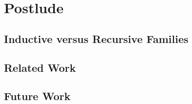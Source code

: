 \documentclass[12pt]{report}
\theoremstyle{definition}
\theoremstyle{remark}
\numberwithin{definition}{section}
\numberwithin{equation}{section}
\numberwithin{proposition}{section}
\numberwithin{conjecture}{section}
\numberwithin{theorem}{section}
\numberwithin{lemma}{section}
\numberwithin{corollary}{section}
\numberwithin{example}{section}
\numberwithin{remark}{section}
\begin{document}



\part{Postlude}\label{part:postlude}
\chapter{Inductive versus Recursive Families}\label{ch:ivsr}
\chapter{Related Work}\label{ch:related}
\chapter{Future Work}\label{ch:future}
\end{document}
